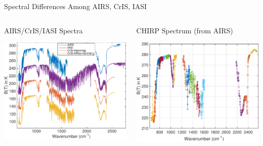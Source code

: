 \documentclass[10pt,t]{beamer}
\begin{document}
\begin{frame}[label={sec:org8da6082}]{Spectral Differences Among AIRS, CrIS, IASI}
\vspace{-0.2in}
\begin{columns}
\begin{column}{0.55\columnwidth}
\begin{block}{AIRS/CrIS/IASI Spectra}
\begin{center}
\includegraphics[width=\linewidth]{./Figs/Pdf/hyperall_hamming.pdf}
\end{center}
\end{block}
\end{column}


\begin{column}{0.55\columnwidth}
\begin{block}{CHIRP Spectrum (from AIRS)}
\begin{center}
\includegraphics[width=\linewidth]{./Figs/Pdf/a2c_full.pdf}
\end{center}
\end{block}
\end{column}
\end{columns}


\end{frame}
\end{document}

